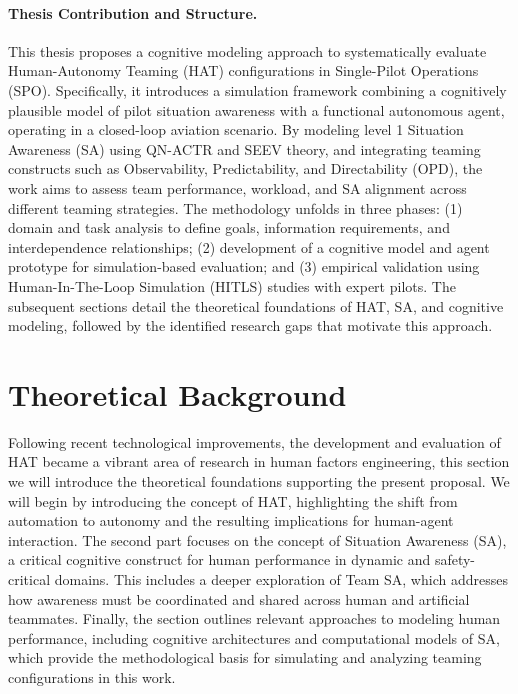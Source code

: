 \documentclass[12pt,a4paper]{article} %
\begin{document}
	\paragraph{Thesis Contribution and Structure.} 
	This thesis proposes a cognitive modeling approach to systematically evaluate Human-Autonomy Teaming (HAT) configurations in Single-Pilot Operations (SPO). Specifically, it introduces a simulation framework combining a cognitively plausible model of pilot situation awareness with a functional autonomous agent, operating in a closed-loop aviation scenario. By modeling level 1 Situation Awareness (SA) using QN-ACTR and SEEV theory, and integrating teaming constructs such as Observability, Predictability, and Directability (OPD), the work aims to assess team performance, workload, and SA alignment across different teaming strategies. The methodology unfolds in three phases: (1) domain and task analysis to define goals, information requirements, and interdependence relationships; (2) development of a cognitive model and agent prototype for simulation-based evaluation; and (3) empirical validation using Human-In-The-Loop Simulation (HITLS) studies with expert pilots. The subsequent sections detail the theoretical foundations of HAT, SA, and cognitive modeling, followed by the identified research gaps that motivate this approach.

	\section{Theoretical Background}

	Following recent technological improvements, the development and evaluation of HAT became a vibrant area of research in human factors engineering, this section we will introduce the theoretical foundations supporting the present proposal. We will begin by introducing the concept of HAT, highlighting the shift from automation to autonomy and the resulting implications for human-agent interaction. The second part focuses on the concept of Situation Awareness (SA), a critical cognitive construct for human performance in dynamic and safety-critical domains. This includes a deeper exploration of Team SA, which addresses how awareness must be coordinated and shared across human and artificial teammates. Finally, the section outlines relevant approaches to modeling human performance, including cognitive architectures and computational models of SA, which provide the methodological basis for simulating and analyzing teaming configurations in this work.
\end{document}
